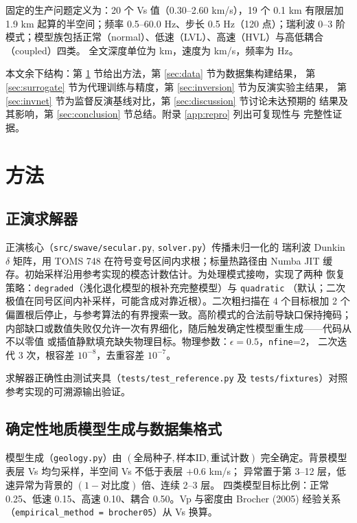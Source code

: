 \documentclass[UTF8,a4paper,11pt]{ctexart}
\begin{document}
固定的生产问题定义为：20 个 Vs 值（0.30--2.60 km/s），19 个 0.1 km 有限层加
1.9 km 起算的半空间；频率 0.5--60.0 Hz、步长 0.5 Hz（120 点）；瑞利波 0--3 阶
模式；模型族包括正常（normal）、低速（LVL）、高速（HVL）与高低耦合（coupled）四类。
全文深度单位为 km，速度为 km/s，频率为 Hz。

本文余下结构：第 \ref{sec:method} 节给出方法，第 \ref{sec:data} 节为数据集构建结果，
第 \ref{sec:surrogate} 节为代理训练与精度，第 \ref{sec:inversion} 节为反演实验主结果，
第 \ref{sec:invnet} 节为监督反演基线对比，第 \ref{sec:discussion} 节讨论未达预期的
结果及其影响，第 \ref{sec:conclusion} 节总结。附录 \ref{app:repro} 列出可复现性与
完整性证据。

\section{方法}\label{sec:method}

\subsection{正演求解器}
正演核心（\texttt{src/swave/secular.py}, \texttt{solver.py}）传播未归一化的
瑞利波 Dunkin \(\delta\) 矩阵，用 TOMS 748 在符号变号区间内求根；标量热路径由
Numba JIT 缓存。初始采样沿用参考实现的模态计数估计。为处理模式接吻，实现了两种
恢复策略：\texttt{degraded}（浅化退化模型的根补充完整模型）与 \texttt{quadratic}
（默认；二次极值在同号区间内补采样，可能含成对靠近根）。二次粗扫描在 4 个目标根加
2 个偏置根后停止，与参考算法的有界搜索一致。高阶模式的合法前导缺口保持掩码；
内部缺口或数值失败仅允许一次有界细化，随后触发确定性模型重生成——代码从不以零值
或插值静默填充缺失物理目标。物理参数：\(\epsilon=0.5\)，\texttt{nfine}=2，
二次迭代 3 次，根容差 \(10^{-8}\)，去重容差 \(10^{-7}\)。

求解器正确性由测试夹具（\texttt{tests/test\_reference.py} 及
\texttt{tests/fixtures}）对照参考实现的可溯源输出验证。

\subsection{确定性地质模型生成与数据集格式}
模型生成（\texttt{geology.py}）由 \((\text{全局种子},\text{样本ID},\text{重试计数})\)
完全确定。背景模型表层 Vs 均匀采样，半空间 Vs 不低于表层 \(+0.6\) km/s；
异常置于第 3--12 层，低速异常为背景的 \((1-\text{对比度})\) 倍、连续 2--3 层。
四类模型目标比例：正常 0.25、低速 0.15、高速 0.10、耦合 0.50。Vp 与密度由
Brocher (2005) 经验关系（\texttt{empirical\_method = brocher05}）从 Vs 换算。
\end{document}
